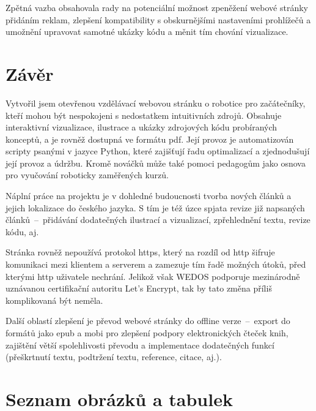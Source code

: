 \documentclass[a4paper, 12pt]{article}
\makeatletter
\renewcommand\listoffigures{%
    \@mkboth{\MakeUppercase\listfigurename}%
        {\MakeUppercase\listfigurename}%
    \@starttoc{lof}%
}
\renewcommand\listoftables{%
    \@mkboth{\MakeUppercase\listtablename}%
        {\MakeUppercase\listtablename}%
    \@starttoc{lot}%
}
\makeatother
\begin{document}
  Zpětná vazba obsahovala rady na potenciální možnost zpeněžení webové stránky přidáním reklam, zlepšení kompatibility s obskurnějšími nastaveními prohlížečů a umožnění upravovat samotné ukázky kódu a měnit tím chování vizualizace.

  \newpage

  \section{Závěr}
  Vytvořil jsem otevřenou vzdělávací webovou stránku o robotice pro začátečníky, kteří mohou být nespokojeni s nedostatkem intuitivních zdrojů. Obsahuje interaktivní vizualizace, ilustrace a ukázky zdrojových kódu probíraných konceptů, a je rovněž dostupná ve formátu \gls{pdf}. Její provoz je automatizován scripty psanými v jazyce Python, které zajišťují řadu optimalizací a zjednodušují její provoz a údržbu. Kromě nováčků může také pomoci pedagogům jako osnova pro vyučování roboticky zaměřených kurzů.

  Náplní práce na projektu je v dohledné budoucnosti tvorba nových článků a jejich lokalizace do českého jazyka. S tím je též úzce spjata revize již napsaných článků~--~přidávání dodatečných ilustrací a vizualizací, zpřehlednění textu, revize kódu, aj.

  Stránka rovněž nepoužívá protokol \gls{https}, který na rozdíl od \gls{http} šifruje komunikaci mezi klientem a serverem a zamezuje tím řadě možných útoků, před kterými \gls{http} uživatele nechrání. Jelikož však WEDOS podporuje mezinárodně uznávanou certifikační autoritu Let's Encrypt, tak by tato změna příliš komplikovaná být neměla.

  Další oblastí zlepšení je převod webové stránky do offline verze~--~export do formátů jako \gls{epub} a \gls{mobi} pro zlepšení podpory elektronických čteček knih, zajištění větší spolehlivosti převodu a implementace dodatečných funkcí (přeškrtnutí textu, podtržení textu, reference, citace, aj.).

  \newpage

  \printbibliography[heading=bibnumbered, title=Použitá literatura]

  \newpage

  \section{Seznam obrázků a tabulek}
  \listoffigures%
  \vspace{\baselineskip}
  \listoftables%
\end{document}
